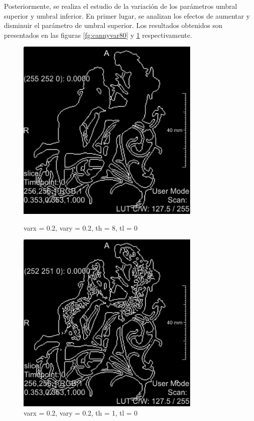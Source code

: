 \documentclass{article}
\begin{document}
Posteriormente, se realiza el estudio de la variación de los parámetros umbral superior y umbral inferior. En primer lugar, se analizan los efectos de aumentar y disminuir el parámetro de umbral superior. Los resultados obtenidos son presentados en las figuras \ref{fg:cannyvar80} y \ref{fg:cannyvar10} respectivamente.

\begin{figure}[ht]
\centering
\begin{minipage}{.5\textwidth}
  \centering
  \includegraphics[width=0.8\textwidth]{4sintesis/cannyu8l0.png}
  \caption{varx = 0.2, vary = 0.2, th = 8, tl = 0}
\label{fg:cannyvar80}
\end{minipage}%
\begin{minipage}{.5\textwidth}
  \centering
  \includegraphics[width=0.8\textwidth]{4sintesis/cannyu1l0.png}
  \caption{varx = 0.2, vary = 0.2, th = 1, tl = 0}
\label{fg:cannyvar10}
\end{minipage}
\end{figure}
\FloatBarrier
\end{document}
